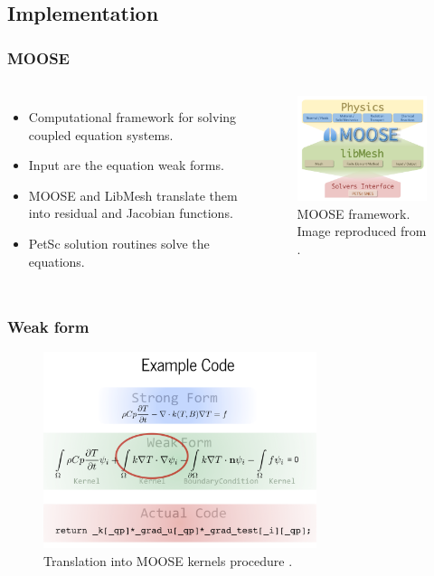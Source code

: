 \subsection{Implementation}

\begin{frame}
\frametitle{MOOSE}
\begin{columns}
    \column[t]{5cm}
  \begin{itemize}
      \item Computational framework for solving coupled equation systems.
      \item Input are the equation weak forms.
      \item MOOSE and LibMesh translate them into residual and Jacobian functions.
      \item PetSc solution routines solve the equations.
    \end{itemize}

  \column[t]{5cm}
  \begin{figure}[htbp!]
    \begin{center}
      \includegraphics[width=5cm]{figures/moose}
    \end{center}
    \caption{MOOSE framework. Image reproduced from \cite{inl_workshop_2020}.}
  \end{figure}
\end{columns}
\end{frame}


\begin{frame}
\frametitle{Weak form}

\begin{figure}[htbp!]
    \begin{center}
        \includegraphics[width=8cm]{figures/moose2}
    \end{center}
    \caption{Translation into MOOSE kernels procedure \cite{inl_workshop_2020}.}
\end{figure}
\end{frame}


